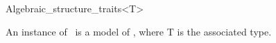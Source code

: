 \begin{ccRefClass}{Algebraic_structure_traits<T>}

\ccDefinition

An instance of \ccClassTemplateName\ is a model of , where {\sc T} is the associated type. 


\ccIsModel
{}\\

\end{ccRefClass} 